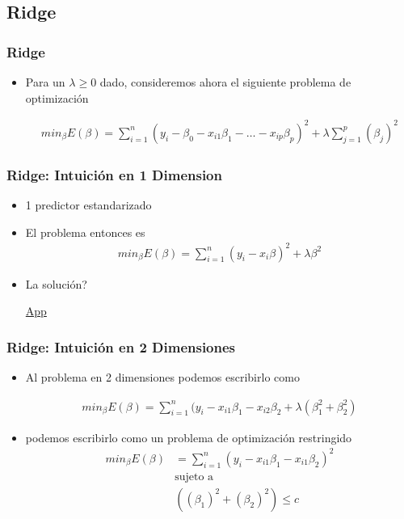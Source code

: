 \documentclass[
  shownotes,
  xcolor={svgnames},
  hyperref={colorlinks,citecolor=DarkBlue,linkcolor=andesred,urlcolor=DarkBlue}
  , aspectratio=169]{beamer}
\begin{document}
\subsection{Ridge}
\begin{frame}[fragile]
\frametitle{Ridge}

\begin{itemize}
\item Para un $\lambda \geq 0$ dado, consideremos ahora el siguiente problema de optimización


\begin{align}
min_{\beta} E(\beta) = \sum_{i=1}^n (y_i-\beta_0 - x_{i1}\beta_1 - \dots - x_{ip}\beta_p)^2 + \lambda \sum_{j=1}^p (\beta_j)^2
\end{align}



\end{itemize}
\end{frame}
\begin{frame}[fragile]
\frametitle{Ridge: Intuición en 1 Dimension }

\begin{itemize}
\item 1 predictor estandarizado
\medskip
\item El problema entonces es 
\begin{align}
min_{\beta} E(\beta) = \sum_{i=1}^n (y_i- x_{i}\beta )^2 + \lambda \beta^2
\end{align}

\item La solución?

\vspace{2in}
\href{https://cede.uniandes.edu.co/OLS/}{App}
\end{itemize}
\end{frame}
\begin{frame}[fragile]
\frametitle{Ridge: Intuición en 2 Dimensiones }

\begin{itemize}
\item Al problema en 2 dimensiones podemos escribirlo como

  \begin{align}
  min_{\beta} E(\beta) = \sum_{i=1}^n (y_i  - x_{i1}\beta_1  - x_{i2}\beta_2 + \lambda  \left(\beta_1^2 + \beta_2^2 \right)
  \end{align}
\medskip 
\item podemos escribirlo como un problema de optimización restringido
  \begin{align}
     min_{\beta} E(\beta) &= \sum_{i=1}^n (y_i - x_{i1}\beta_1 - x_{i1}\beta_2)^2  \\ \nonumber
     & \text{sujeto a}   \\
     & \left( (\beta_1)^2 + (\beta_2)^2 \right) \leq c \nonumber
  \end{align}

\end{itemize}

\end{frame}
\end{document}
